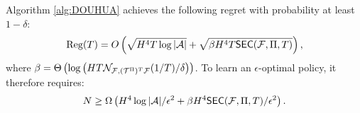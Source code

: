 \begin{thm}
    
Algorithm \ref{alg:DOUHUA} achieves the following regret with probability at least $1-\delta$:
\begin{align*}
    \mathrm{Reg}(T)
    = O\left(\sqrt{H^4 T \log|{\mathcal{A}}|} + \sqrt{\beta H^4 T\mathsf{SEC}({\mathcal{F}}, \Pi, T)}\right),
\end{align*}
where $\beta = \Theta\left(\log \left(HT \mathcal{N}_{{\mathcal{F}}, ({\mathcal{T}}^{\Pi})^T {\mathcal{F}}}(1/T) / \delta\right)\right)$. To learn an $\epsilon$-optimal policy, it therefore requires:
\begin{align*}N \geq \Omega\left(H^4 \log|{\mathcal{A}}|/\epsilon^2 + \beta H^4 \mathsf{SEC}({\mathcal{F}}, \Pi, T)/\epsilon^2\right).\end{align*}
\label{thm:regret-bound-douhua}
\end{thm}


